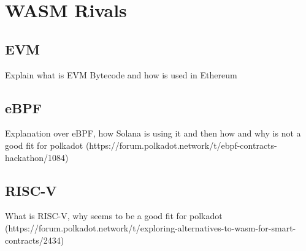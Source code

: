 \documentclass[../main.tex]{subfiles}
\begin{document}
\section{WASM Rivals}
\subsection{EVM}

Explain what is EVM Bytecode and how is used in Ethereum

\subsection{eBPF}

Explanation over eBPF, how Solana is using it and then how and why is not a good fit for polkadot (https://forum.polkadot.network/t/ebpf-contracts-hackathon/1084)

\subsection{RISC-V}

What is RISC-V, why seems to be a good fit for polkadot (https://forum.polkadot.network/t/exploring-alternatives-to-wasm-for-smart-contracts/2434)
\end{document}
